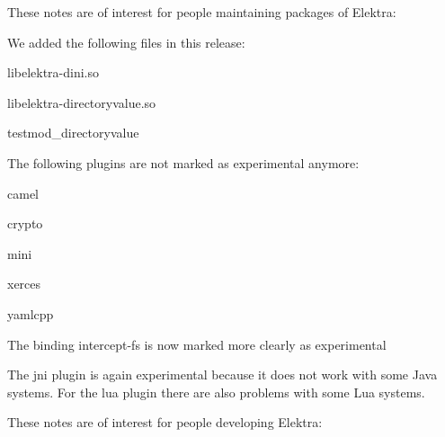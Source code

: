 These notes are of interest for people maintaining packages of Elektra\+:


\begin{DoxyItemize}
\item We added the following files in this release\+:
\begin{DoxyItemize}
\item {\ttfamily libelektra-\/dini.\+so}
\item {\ttfamily libelektra-\/directoryvalue.\+so}
\item {\ttfamily testmod\+\_\+directoryvalue}
\end{DoxyItemize}
\item The following plugins are not marked as experimental anymore\+:
\begin{DoxyItemize}
\item {\ttfamily camel}
\item {\ttfamily crypto}
\item {\ttfamily mini}
\item {\ttfamily xerces}
\item {\ttfamily yamlcpp}
\end{DoxyItemize}
\item The binding {\ttfamily intercept-\/fs} is now marked more clearly as experimental
\item The {\ttfamily jni} plugin is again experimental because it does not work with some Java systems. For the {\ttfamily lua} plugin there are also problems with some Lua systems.
\end{DoxyItemize}

These notes are of interest for people developing Elektra\+:



